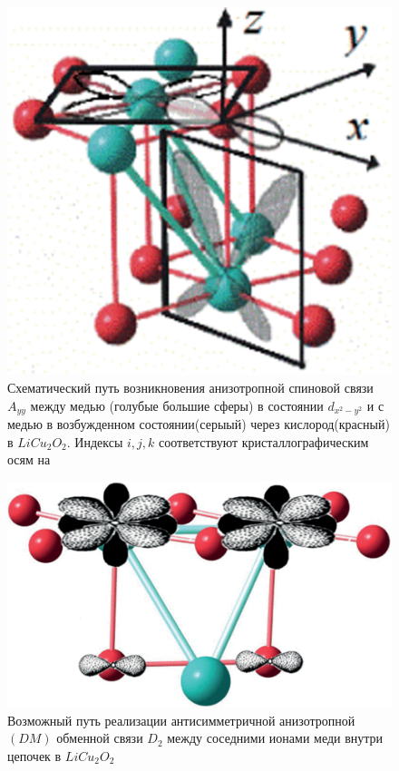 \documentclass[11pt]{article}
\begin{document}
\begin{figure}[htp]
\centering
\includegraphics[scale=0.7]{LiCu2O2_2}
\caption {Схематический путь возникновения анизотропной спиновой связи $A_{yy}$ между медью (голубые большие сферы) в состоянии $d_{x^2-y^2}$ и с медью в возбужденном состоянии(серыый) через кислород(красный)  в $LiCu_2O_2$. Индексы $i,j,k$ соответствуют кристаллографическим осям на ~\cite{seidov2017}}
\label{}
\end{figure}

\begin{figure}[htp]
\centering
\includegraphics[scale=0.7]{LiCu2O2_3}
\caption {Возможный путь реализации антисимметричной анизотропной $(DM)$ обменной связи $D_2$ между соседними ионами меди внутри цепочек в $LiCu_2O_2$ ~\cite{seidov2017}}
\label{}
\end{figure}
\end{document}

